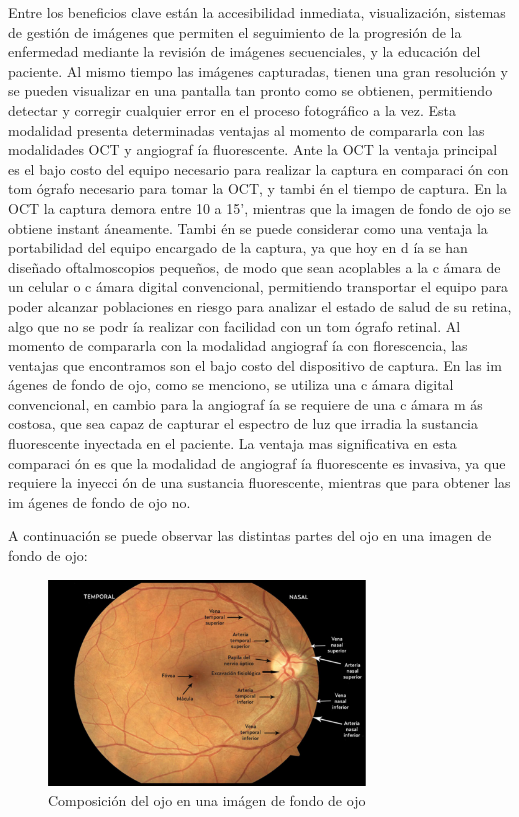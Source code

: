 Entre los beneficios clave est\'an la accesibilidad inmediata, visualizaci\'on, sistemas de gesti\'on de im\'agenes que permiten el seguimiento de la progresi\'on de la enfermedad mediante la revisi\'on de im\'agenes secuenciales, y la educaci\'on del paciente. Al mismo tiempo las im\'agenes capturadas, tienen una  gran resoluci\'on y se pueden visualizar en una pantalla tan pronto como se obtienen, permitiendo detectar y corregir cualquier error en el proceso fotogr\'afico a la vez. \cite{cunha2004blood}
Esta modalidad presenta determinadas ventajas al momento de compararla con las modalidades OCT y angiograf \'ia fluorescente. 
Ante la OCT la ventaja principal es el bajo costo del equipo necesario para realizar la captura en comparaci \'on con tom \'ografo necesario para tomar la OCT, y tambi \'en el tiempo de captura. En la OCT la captura demora entre 10 a 15’, mientras que la imagen de fondo de ojo se obtiene instant \'aneamente. Tambi \'en se puede considerar como una ventaja la portabilidad del equipo encargado de la captura, ya que hoy en d \'ia se han diseñado oftalmoscopios pequeños, de modo que sean acoplables a la c \'amara de un celular o c \'amara digital convencional, permitiendo transportar el equipo para poder alcanzar poblaciones en riesgo para analizar el estado de salud de su retina, algo que no se podr \'ia realizar con facilidad con un tom \'ografo retinal.
Al momento de compararla con la modalidad angiograf \'ia con florescencia, las ventajas que encontramos son el bajo costo del dispositivo de captura. En las im \'agenes de fondo de ojo, como se menciono, se utiliza una c \'amara digital convencional, en cambio para la angiograf \'ia se requiere de una c \'amara m \'as costosa, que sea capaz de capturar el espectro de luz que irradia la sustancia fluorescente inyectada en el paciente. La ventaja mas significativa en esta comparaci \'on es que la modalidad de angiograf \'ia fluorescente es invasiva, ya que requiere la inyecci \'on de una sustancia fluorescente, mientras que para obtener las im \'agenes de fondo de ojo no.

A continuaci\'on se puede observar las distintas partes del ojo en una imagen de fondo de ojo:
\begin{figure}[H]
	{
	\centering
	\includegraphics[width=0.75\textwidth]{Figures/ComposicionOjoIFO}
	\caption[Glaucoma]{Composici\'on del ojo en una im\'agen de fondo de ojo}
	\label{fig:Composici\'on del ojo, observada en una im\'agen de fondo de ojo}
	}
\end{figure}

